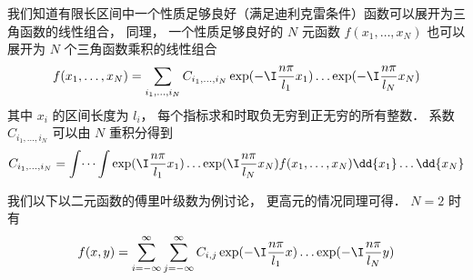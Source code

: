 

我们知道有限长区间中一个性质足够良好（满足迪利克雷条件）函数可以展开为三角函数的线性组合， 同理， 一个性质足够良好的 $N$ 元函数 $f(x_1, \dots, x_N)$ 也可以展开为 $N$ 个三角函数乘积的线性组合
\begin{equation}
f(x_1, \dots, x_N) = \sum_{i_1,\dots, i_N} C_{i_1,\dots, i_N} \exp(-\I \frac{n\pi}{l_1} x_1) \dots \exp(-\I \frac{n\pi}{l_N} x_N)
\end{equation}
其中 $x_i$ 的区间长度为 $l_i$， 每个指标求和时取负无穷到正无穷的所有整数． 系数 $C_{i_1,\dots, i_N}$ 可以由 $N$ 重积分得到
\begin{equation}
C_{i_1,\dots, i_N} = \int\dots\int  \exp(\I \frac{n\pi}{l_1} x_1) \dots \exp(\I \frac{n\pi}{l_N} x_N) f(x_1, \dots, x_N) \dd{x_1}\dots\dd{x_N}
\end{equation}


我们以下以二元函数的傅里叶级数为例讨论， 更高元的情况同理可得． $N = 2$ 时有
\begin{equation}
f(x, y) = \sum_{i = -\infty}^\infty \sum_{j = -\infty}^\infty C_{i, j} \exp(-\I \frac{n\pi}{l_1} x) \dots \exp(-\I \frac{n\pi}{l_N} y)
\end{equation}
